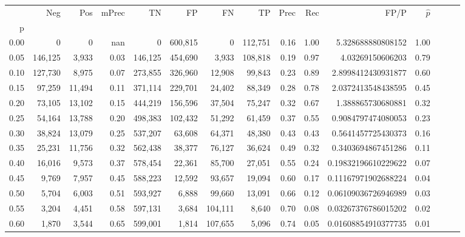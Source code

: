 \begin{tabular}{rrrrrrrrrrrrrrr}
\toprule
{} &      Neg &     Pos & mPrec &       TN &       FP &       FN &       TP &  Prec &   Rec &                    FP/P & $\hat{p}$ \\
p    &          &         &       &          &          &          &          &       &       &                         &           \\
\midrule
0.00 &        0 &       0 &   nan &        0 &  600,815 &        0 &  112,751 &  0.16 &  1.00 &       5.328688880808152 &      1.00 \\
0.05 &  146,125 &   3,933 &  0.03 &  146,125 &  454,690 &    3,933 &  108,818 &  0.19 &  0.97 &        4.03269150606203 &      0.79 \\
0.10 &  127,730 &   8,975 &  0.07 &  273,855 &  326,960 &   12,908 &   99,843 &  0.23 &  0.89 &      2.8998412430931877 &      0.60 \\
0.15 &   97,259 &  11,494 &  0.11 &  371,114 &  229,701 &   24,402 &   88,349 &  0.28 &  0.78 &      2.0372413548438595 &      0.45 \\
0.20 &   73,105 &  13,102 &  0.15 &  444,219 &  156,596 &   37,504 &   75,247 &  0.32 &  0.67 &       1.388865730680881 &      0.32 \\
0.25 &   54,164 &  13,788 &  0.20 &  498,383 &  102,432 &   51,292 &   61,459 &  0.37 &  0.55 &      0.9084797474080053 &      0.23 \\
0.30 &   38,824 &  13,079 &  0.25 &  537,207 &   63,608 &   64,371 &   48,380 &  0.43 &  0.43 &      0.5641457725430373 &      0.16 \\
0.35 &   25,231 &  11,756 &  0.32 &  562,438 &   38,377 &   76,127 &   36,624 &  0.49 &  0.32 &      0.3403694867451286 &      0.11 \\
0.40 &   16,016 &   9,573 &  0.37 &  578,454 &   22,361 &   85,700 &   27,051 &  0.55 &  0.24 &     0.19832196610229622 &      0.07 \\
0.45 &    9,769 &   7,957 &  0.45 &  588,223 &   12,592 &   93,657 &   19,094 &  0.60 &  0.17 &     0.11167971902688224 &      0.04 \\
0.50 &    5,704 &   6,003 &  0.51 &  593,927 &    6,888 &   99,660 &   13,091 &  0.66 &  0.12 &     0.06109036726946989 &      0.03 \\
0.55 &    3,204 &   4,451 &  0.58 &  597,131 &    3,684 &  104,111 &    8,640 &  0.70 &  0.08 &     0.03267376786015202 &      0.02 \\
0.60 &    1,870 &   3,544 &  0.65 &  599,001 &    1,814 &  107,655 &    5,096 &  0.74 &  0.05 &     0.01608854910377735 &      0.01 \\

\end{tabular}
